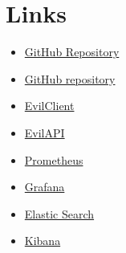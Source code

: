 \documentclass[report/main.tex]{subfiles}
\begin{document}
    \section{Links}
        \begin{itemize}
            \item \href{https://github.com/gustavjohansen98/E-vil-Corp}{GitHub Repository}
            \item \href{https://github.com/gustavjohansen98/E-vil-Corp/projects/1}{GitHub repository}
            \item \href{http://159.89.213.38:5000/public}{EvilClient}
            \item \href{http://159.89.213.38:5010/latest}{EvilAPI}
            \item \href{http://159.89.213.38:9090/}{Prometheus}
            \item \href{http://159.89.213.38:3000/}{Grafana}
            \item \href{http://159.89.213.38:9200/}{Elastic Search}
            \item \href{http://159.89.213.38:5601/app/home}{Kibana}
        \end{itemize}
\end{document}
